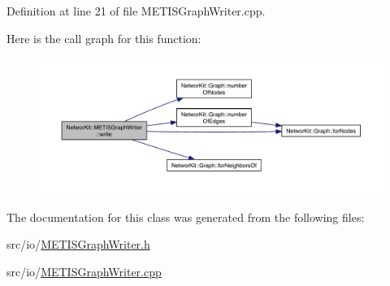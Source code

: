 Definition at line 21 of file M\-E\-T\-I\-S\-Graph\-Writer.\-cpp.



Here is the call graph for this function\-:\nopagebreak
\begin{figure}[H]
\begin{center}
\leavevmode
\includegraphics[width=350pt]{class_networ_kit_1_1_m_e_t_i_s_graph_writer_abdcb33b499d9edc4035fc78a68d0045f_cgraph}
\end{center}
\end{figure}




The documentation for this class was generated from the following files\-:\begin{DoxyCompactItemize}
\item 
src/io/\hyperlink{_m_e_t_i_s_graph_writer_8h}{M\-E\-T\-I\-S\-Graph\-Writer.\-h}\item 
src/io/\hyperlink{_m_e_t_i_s_graph_writer_8cpp}{M\-E\-T\-I\-S\-Graph\-Writer.\-cpp}\end{DoxyCompactItemize}
